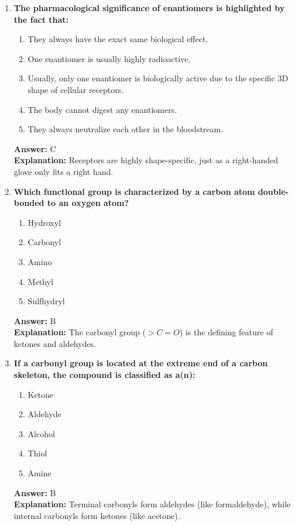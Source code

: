 \documentclass[11pt, a4paper]{article}
\begin{document}
\begin{enumerate}
\item \textbf{The pharmacological significance of enantiomers is highlighted by the fact that:}
\begin{enumerate}[label=\Alph*.]
    \item They always have the exact same biological effect.
    \item One enantiomer is usually highly radioactive.
    \item Usually, only one enantiomer is biologically active due to the specific 3D shape of cellular receptors.
    \item The body cannot digest any enantiomers.
    \item They always neutralize each other in the bloodstream.
\end{enumerate}
\textbf{Answer:} C \\
\textbf{Explanation:} Receptors are highly shape-specific, just as a right-handed glove only fits a right hand.

\item \textbf{Which functional group is characterized by a carbon atom double-bonded to an oxygen atom?}
\begin{enumerate}[label=\Alph*.]
    \item Hydroxyl
    \item Carbonyl
    \item Amino
    \item Methyl
    \item Sulfhydryl
\end{enumerate}
\textbf{Answer:} B \\
\textbf{Explanation:} The carbonyl group ($>C=O$) is the defining feature of ketones and aldehydes.

\item \textbf{If a carbonyl group is located at the extreme end of a carbon skeleton, the compound is classified as a(n):}
\begin{enumerate}[label=\Alph*.]
    \item Ketone
    \item Aldehyde
    \item Alcohol
    \item Thiol
    \item Amine
\end{enumerate}
\textbf{Answer:} B \\
\textbf{Explanation:} Terminal carbonyls form aldehydes (like formaldehyde), while internal carbonyls form ketones (like acetone).


\end{enumerate}
\end{document}
